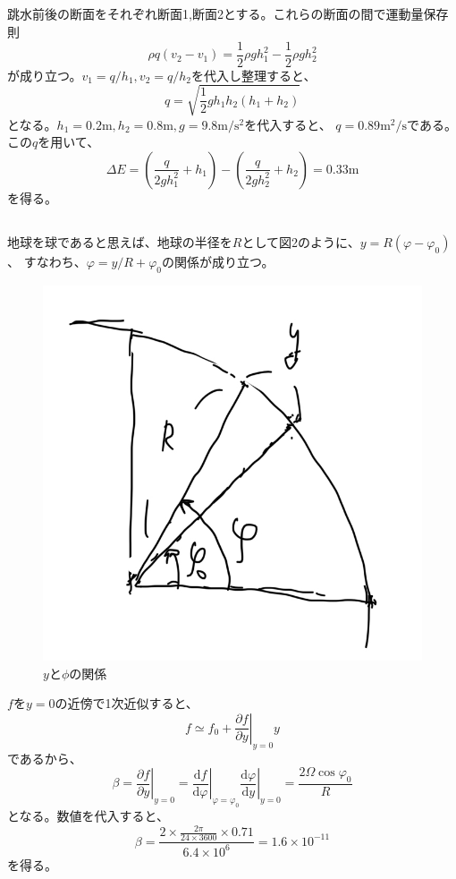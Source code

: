 \documentclass[a4paper]{jsarticle}
\begin{document}
\subsection{}
跳水前後の断面をそれぞれ断面1,断面2とする。これらの断面の間で運動量保存則
\begin{equation}
  \rho q (v_2 - v_1) 
  = \frac{1}{2} \rho g h_1^2 - \frac{1}{2} \rho g h_2^2
\end{equation}
が成り立つ。$v_1 = q / h_1, v_2 = q / h_2$を代入し整理すると、
\begin{equation}
  q = \sqrt{\frac{1}{2} g h_1 h_2 (h_1 + h_2)}
\end{equation}
となる。$h_1 = 0.2 \mathrm{m}, h_2 = 0.8 \mathrm{m}, g = 9.8 \mathrm{m/s^2}$を代入すると、
$q = 0.89 \mathrm{m^2/s}$である。この$q$を用いて、
\begin{equation}
  \Delta E = \left(\frac{q}{2g h_1^2} + h_1\right)
  - \left(\frac{q}{2g h_2^2} + h_2\right) = 0.33 \mathrm{m}
\end{equation}
を得る。

\subsection{}
地球を球であると思えば、地球の半径を$R$として図2のように、$y = R (\varphi - \varphi_0)$、
すなわち、$\varphi = y / R + \varphi_0$の関係が成り立つ。\par
\begin{figure}[htb]
  \centering
  \includegraphics[width=0.3\hsize]{fig2.png}
  \caption{$y$と$\phi$の関係}
\end{figure}
$f$を$y = 0$の近傍で1次近似すると、
\begin{equation}
  f \simeq f_0 + \left.\frac{\partial f}{\partial y}\right|_{y=0} y
\end{equation}
であるから、
\begin{equation}
  \beta = \left.\frac{\partial f}{\partial y}\right|_{y=0}
  = \left.\frac{\mathrm{d} f}{\mathrm{d} \varphi}\right|_{\varphi = \varphi_0}
  \left.\frac{\mathrm{d} \varphi}{\mathrm{d} y}\right|_{y=0} 
  =\frac{2 \Omega \cos \varphi_0}{R}
\end{equation}
となる。数値を代入すると、
\begin{equation}
  \beta = \frac{2 \times \frac{2 \pi}{24 \times 3600} \times 0.71}{6.4 \times 10^6} = 1.6 \times 10^{-11}
\end{equation}
を得る。
\end{document}

